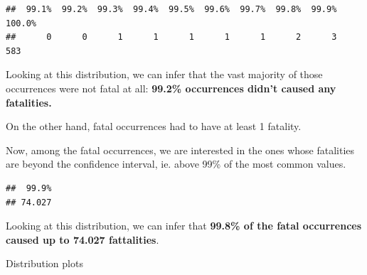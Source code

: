 \documentclass[]{article}
\newenvironment{Shaded}{\begin{snugshade}}{\end{snugshade}}
\newcommand{\KeywordTok}[1]{\textcolor[rgb]{0.13,0.29,0.53}{\textbf{{#1}}}}
\newcommand{\DataTypeTok}[1]{\textcolor[rgb]{0.13,0.29,0.53}{{#1}}}
\newcommand{\DecValTok}[1]{\textcolor[rgb]{0.00,0.00,0.81}{{#1}}}
\newcommand{\FloatTok}[1]{\textcolor[rgb]{0.00,0.00,0.81}{{#1}}}
\newcommand{\StringTok}[1]{\textcolor[rgb]{0.31,0.60,0.02}{{#1}}}
\newcommand{\CommentTok}[1]{\textcolor[rgb]{0.56,0.35,0.01}{\textit{{#1}}}}
\newcommand{\NormalTok}[1]{{#1}}
\begin{document}
\begin{verbatim}
##  99.1%  99.2%  99.3%  99.4%  99.5%  99.6%  99.7%  99.8%  99.9% 100.0% 
##      0      0      1      1      1      1      1      2      3    583
\end{verbatim}

Looking at this distribution, we can infer that the vast majority of
those occurrences were not fatal at all: \textbf{99.2\% occurrences
didn't caused any fatalities.}

On the other hand, fatal occurrences had to have at least 1 fatality.

Now, among the fatal occurrences, we are interested in the ones whose
fatalities are beyond the confidence interval, ie. above 99\% of the
most common values.

\begin{Shaded}
\end{Shaded}

\begin{verbatim}
##  99.9% 
## 74.027
\end{verbatim}

Looking at this distribution, we can infer that \textbf{99.8\% of the
fatal occurrences caused up to 74.027 fattalities}.

Distribution plots
\end{document}
